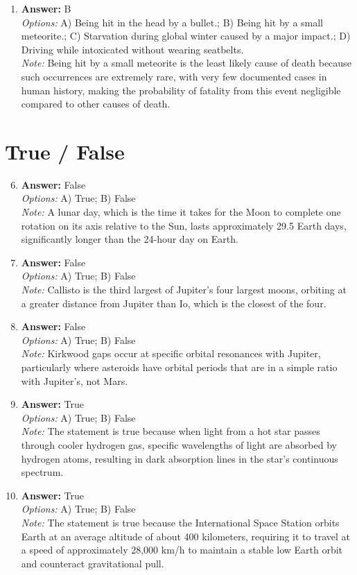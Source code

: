 \documentclass[12pt]{article}
\begin{document}
\begin{enumerate}[label=\arabic*.]
\item \textbf{Answer:} B
\\ \textit{Options:} A) Being hit in the head by a bullet.; B) Being hit by a small meteorite.; C) Starvation during global winter caused by a major impact.; D) Driving while intoxicated without wearing seatbelts.
\\ \textit{Note:} Being hit by a small meteorite is the least likely cause of death because such occurrences are extremely rare, with very few documented cases in human history, making the probability of fatality from this event negligible compared to other causes of death.
\end{enumerate}

\section*{True / False}
\begin{enumerate}[label=\arabic*.]
\setcounter{enumi}{5}
\item \textbf{Answer:} False
\\ \textit{Options:} A) True; B) False
\\ \textit{Note:} A lunar day, which is the time it takes for the Moon to complete one rotation on its axis relative to the Sun, lasts approximately 29.5 Earth days, significantly longer than the 24-hour day on Earth.
\item \textbf{Answer:} False
\\ \textit{Options:} A) True; B) False
\\ \textit{Note:} Callisto is the third largest of Jupiter's four largest moons, orbiting at a greater distance from Jupiter than Io, which is the closest of the four.
\item \textbf{Answer:} False
\\ \textit{Options:} A) True; B) False
\\ \textit{Note:} Kirkwood gaps occur at specific orbital resonances with Jupiter, particularly where asteroids have orbital periods that are in a simple ratio with Jupiter's, not Mars.
\item \textbf{Answer:} True
\\ \textit{Options:} A) True; B) False
\\ \textit{Note:} The statement is true because when light from a hot star passes through cooler hydrogen gas, specific wavelengths of light are absorbed by hydrogen atoms, resulting in dark absorption lines in the star's continuous spectrum.
\item \textbf{Answer:} True
\\ \textit{Options:} A) True; B) False
\\ \textit{Note:} The statement is true because the International Space Station orbits Earth at an average altitude of about 400 kilometers, requiring it to travel at a speed of approximately 28,000 km/h to maintain a stable low Earth orbit and counteract gravitational pull.
\end{enumerate}
\end{document}
